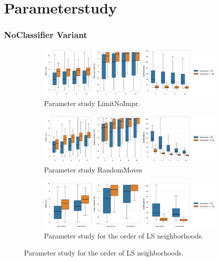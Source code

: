 \clearpage


\section{Parameterstudy}

\subsubsection{NoClassifier Variant}
\label{app:subsec:parameterstudy_noclassifier}


\begin{figure}[!ht]
	\centering
	\begin{subfigure}[t]{0.83\textwidth}
		\centering
		\caption{Parameter study LimitNoImpr.}
		\includegraphics[width=\textwidth]{pictures/parameter_study/LimitNoImpr_base_parameter_study.png}
	\end{subfigure}
	\begin{subfigure}[t]{0.83\textwidth}
		\centering
		\caption{Parameter study RandomMoves}
		\includegraphics[width=\textwidth]{pictures/parameter_study/RandomMoves_base_parameter_study.png}
	\end{subfigure}
	\begin{subfigure}[t]{0.83\textwidth}
		\centering
		\caption{Parameter study for the order of LS neighborhoods.}
		\includegraphics[width=\textwidth]{pictures/parameter_study/LocalSearchTypes_base_parameter_study.png}

\end{subfigure}
\end{figure}
